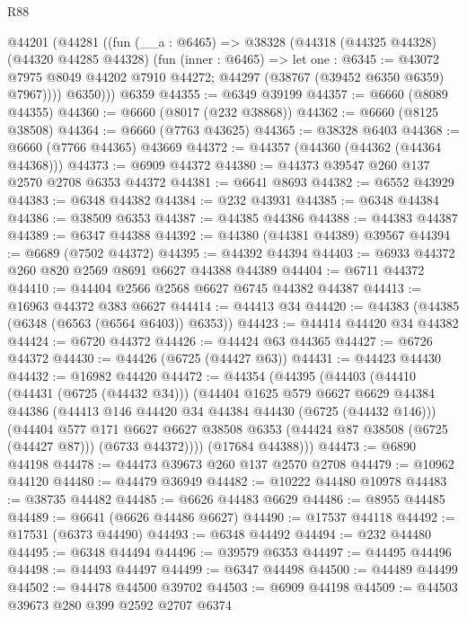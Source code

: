 \begin{lexlean}{R88}
\begin{coremodule}
    @44201
      (@44281
        ((fun (__a : @6465) =>
        @38328
          (@44318
            (@44325 @44328)
            (@44320 @44285 @44328)
            (fun (inner : @6465) =>
            let one : @6345 := @43072 @7975 @8049 @44202 @7910 @44272;
            @44297 (@38767 (@39452 @6350 @6359) @7967))))
          @6350)))
    @6359
@44355 := @6349 @39199
@44357 := @6660 (@8089 @44355)
@44360 := @6660 (@8017 (@232 @38868))
@44362 := @6660 (@8125 @38508)
@44364 := @6660 (@7763 @43625)
@44365 := @38328 @6403
@44368 := @6660 (@7766 @44365) @43669
@44372 := @44357 (@44360 (@44362 (@44364 @44368)))
@44373 := @6909 @44372
@44380 := @44373 @39547 @260 @137 @2570 @2708 @6353 @44372
@44381 := @6641 @8693
@44382 := @6552 @43929
@44383 := @6348 @44382
@44384 := @232 @43931
@44385 := @6348 @44384
@44386 := @38509 @6353
@44387 := @44385 @44386
@44388 := @44383 @44387
@44389 := @6347 @44388
@44392 := @44380 (@44381 @44389) @39567
@44394 := @6689 (@7502 @44372)
@44395 := @44392 @44394
@44403 := @6933 @44372 @260 @820 @2569 @8691 @6627 @44388 @44389
@44404 := @6711 @44372
@44410 := @44404 @2566 @2568 @6627 @6745 @44382 @44387
@44413 := @16963 @44372 @383 @6627
@44414 := @44413 @34
@44420 := @44383 (@44385 (@6348 (@6563 (@6564 @6403)) @6353))
@44423 := @44414 @44420 @34 @44382
@44424 := @6720 @44372
@44426 := @44424 @63 @44365
@44427 := @6726 @44372
@44430 := @44426 (@6725 (@44427 @63))
@44431 := @44423 @44430
@44432 := @16982 @44420
@44472 := @44354
    (@44395
      (@44403
        (@44410
          (@44431 (@6725 (@44432 @34)))
          (@44404
            @1625
            @579
            @6627
            @6629
            @44384
            @44386
            (@44413 @146 @44420 @34 @44384 @44430 (@6725 (@44432 @146)))
            (@44404
              @577
              @171
              @6627
              @6627
              @38508
              @6353
              (@44424 @87 @38508 (@6725 (@44427 @87)))
              (@6733 @44372))))
        (@17684 @44388)))
@44473 := @6890 @44198
@44478 := @44473 @39673 @260 @137 @2570 @2708
@44479 := @10962 @44120
@44480 := @44479 @36949
@44482 := @10222 @44480 @10978
@44483 := @38735 @44482
@44485 := @6626 @44483 @6629
@44486 := @8955 @44485
@44489 := @6641 (@6626 @44486 @6627)
@44490 := @17537 @44118
@44492 := @17531 (@6373 @44490)
@44493 := @6348 @44492
@44494 := @232 @44480
@44495 := @6348 @44494
@44496 := @39579 @6353
@44497 := @44495 @44496
@44498 := @44493 @44497
@44499 := @6347 @44498
@44500 := @44489 @44499
@44502 := @44478 @44500 @39702
@44503 := @6909 @44198
@44509 := @44503 @39673 @280 @399 @2592 @2707 @6374

\end{coremodule}
\end{lexlean}
